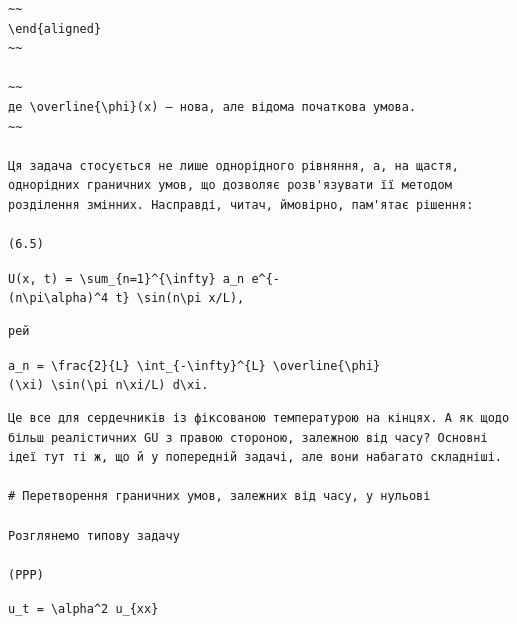 \documentclass[
  ukrainian,
]{article}
\begin{document}
\begin{verbatim}
~~
\end{aligned}
~~

~~
де \overline{\phi}(x) — нова, але відома початкова умова.
~~

Ця задача стосується не лише однорідного рівняння, а, на щастя, однорідних граничних умов, що дозволяє розв'язувати її методом розділення змінних. Насправді, читач, ймовірно, пам'ятає рішення:

(6.5)
\end{verbatim}

\texttt{U(x,\ t)\ =\ \textbackslash{}sum\_\{n=1\}\^{}\{\textbackslash{}infty\}\ a\_n\ e\^{}\{-(n\textbackslash{}pi\textbackslash{}alpha)\^{}4\ t\}\ \textbackslash{}sin(n\textbackslash{}pi\ x/L),}

\begin{verbatim}
рей
\end{verbatim}

\texttt{a\_n\ =\ \textbackslash{}frac\{2\}\{L\}\ \textbackslash{}int\_\{-\textbackslash{}infty\}\^{}\{L\}\ \textbackslash{}overline\{\textbackslash{}phi\}(\textbackslash{}xi)\ \textbackslash{}sin(\textbackslash{}pi\ n\textbackslash{}xi/L)\ d\textbackslash{}xi.}

\begin{verbatim}
Це все для сердечників із фіксованою температурою на кінцях. А як щодо більш реалістичних GU з правою стороною, залежною від часу? Основні ідеї тут ті ж, що й у попередній задачі, але вони набагато складніші.

# Перетворення граничних умов, залежних від часу, у нульові

Розглянемо типову задачу

(PPP)
\end{verbatim}

\texttt{u\_t\ =\ \textbackslash{}alpha\^{}2\ u\_\{xx\}}
\end{document}
